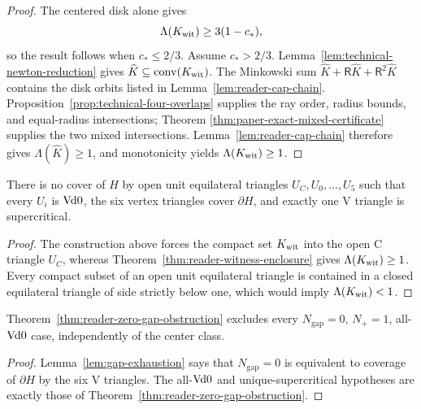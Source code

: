\begin{proof}
The centered disk alone gives
\[
 \Lambda(K_{\rm wit})\ge3(1-c_\ast),
\]
so the result follows when $c_\ast\le2/3$.  Assume $c_\ast>2/3$.
Lemma~\ref{lem:technical-newton-reduction} gives
$\widehat K\subseteq\mathrm{conv}(K_{\rm wit})$.  The Minkowski sum
$\widehat K+\mathsf R\widehat K+\mathsf R^2\widehat K$ contains the disk
orbits listed in Lemma~\ref{lem:reader-cap-chain}.
Proposition~\ref{prop:technical-four-overlaps} supplies the ray order, radius
bounds, and equal-radius intersections; Theorem
\ref{thm:paper-exact-mixed-certificate} supplies the two mixed intersections.
Lemma~\ref{lem:reader-cap-chain} therefore gives
$\Lambda(\widehat K)\ge1$, and monotonicity yields
$\Lambda(K_{\rm wit})\ge1$.
\end{proof}

\begin{theorem}
\label{thm:reader-zero-gap-obstruction}
There is no cover of $H$ by open unit equilateral triangles
$U_C,U_0,\ldots,U_5$ such that every $U_i$ is $\mathrm{Vd0}$, the six vertex
triangles cover $\partial H$, and exactly one V triangle is
supercritical.
\end{theorem}

\begin{proof}
The construction above forces the compact set $K_{\rm wit}$ into the open
C triangle $U_C$, whereas
Theorem~\ref{thm:reader-witness-enclosure} gives
$\Lambda(K_{\rm wit})\ge1$.  Every compact subset of an open unit
equilateral triangle is contained in a closed equilateral triangle of side
strictly below one, which would imply $\Lambda(K_{\rm wit})<1$.
\end{proof}

\begin{proposition}
\label{prop:reader-ab-core-branches}
Theorem~\ref{thm:reader-zero-gap-obstruction} excludes every
$N_{\mathrm{gap}}=0$, $N_+=1$, all-$\mathrm{Vd0}$ case, independently of the
center class.
\end{proposition}

\begin{proof}
Lemma~\ref{lem:gap-exhaustion} says that $N_{\mathrm{gap}}=0$ is equivalent
to coverage of $\partial H$ by the six V triangles.  The all-$\mathrm{Vd0}$ and
unique-supercritical hypotheses are exactly those of
Theorem~\ref{thm:reader-zero-gap-obstruction}.
\end{proof}
